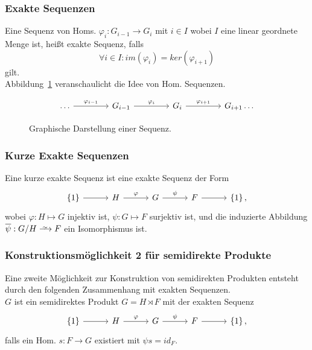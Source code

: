 \documentclass[12pt, german]{article}
\newcommand\iso{\xrightarrow{
		\,\smash{\raisebox{-0.65ex}{\ensuremath{\scriptstyle\sim}}}\,}}
\begin{document}
	\subsubsection{Exakte Sequenzen}
	Eine Sequenz von Homs. $\varphi_i: G_{i-1} \to G_i$ mit $i \in I$ wobei $I$ eine linear geordnete Menge ist, hei\ss t exakte Sequenz, falls $$\forall i \in I : im(\varphi_i) = ker(\varphi_{i+1})$$ gilt.\\
	Abbildung~\ref{fig:sequenz} veranschaulicht die Idee von Hom. Sequenzen.
	\begin{figure}[h!]
		\centering
		\begin{equation*}
			\begin{tikzcd}[column sep=3.5pc]
				\ldots \arrow{r}{\varphi_{i-1}} & G_{i -1} \arrow{r}{\varphi_{i}} & G_{i} \arrow{r}{\varphi_{i+1}} & G_{i+1} \ldots 
			\end{tikzcd}
		\end{equation*}
		\caption{Graphische Darstellung einer Sequenz.}
		\label{fig:sequenz}
	\end{figure}

	\subsubsection{Kurze Exakte Sequenzen}
	Eine kurze exakte Sequenz ist eine exakte Sequenz der Form 
		\begin{equation*}
			\begin{tikzcd}[column sep=2.5pc]
				\{1\} \arrow{r}{} & H \arrow{r}{\varphi} & G \arrow{r}{\psi} & F \arrow{r}{} & \{1\}\, ,
			\end{tikzcd}
		\end{equation*}
	wobei $\varphi: H \mapsto G$ injektiv ist, $\psi: G \mapsto F$ surjektiv ist, und die induzierte Abbildung $\overline{\psi} : G/H \iso F$ ein Isomorphismus ist.
	
	\subsubsection{Konstruktionsmöglichkeit 2 für semidirekte Produkte}
	Eine zweite Möglichkeit zur Konstruktion von semidirekten Produkten entsteht durch den folgenden Zusammenhang mit exakten Sequenzen.\\
	$G$ ist ein semidirektes Produkt $G = H\rtimes F$ mit der exakten Sequenz 
	\begin{equation*}
		\begin{tikzcd}[column sep=2.5pc]
			\{1\} \arrow{r}{} & H \arrow{r}{\varphi} & G \arrow{r}{\psi} & F \arrow{r}{} & \{1\}\, ,
		\end{tikzcd}
	\end{equation*}
	falls ein Hom. $s: F \to G$ existiert  mit $\psi s = id_F$.
	
\end{document}

